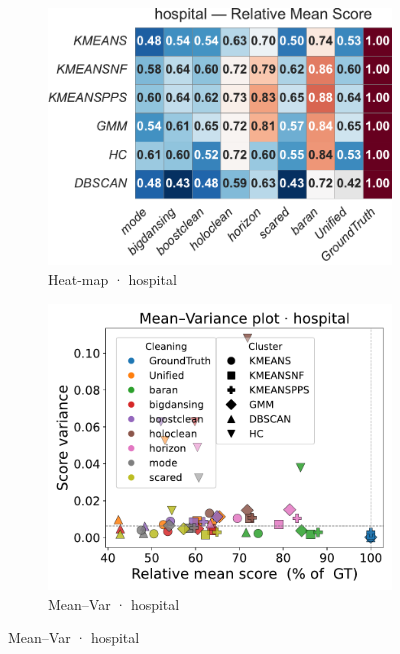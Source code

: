 \documentclass[10pt]{article} %
\numberwithin{equation}{section}
\begin{document}
\begin{figure}[htbp]
  \vspace{0.6em}
  \begin{subfigure}{0.32\linewidth}
    \centering
    \includegraphics[width=\linewidth]{figures/5.3.1graph/heatmap_rel_hospital.pdf}
    \caption{Heat-map · hospital}
  \end{subfigure}\hfill
  \begin{subfigure}{0.32\linewidth}
    \centering
    \includegraphics[width=\linewidth]{figures/5.3.1graph/mean_var_scatter_hospital.pdf}
    \caption{Mean–Var · hospital}
  \end{subfigure}\hfill

\end{figure}
\end{document}
